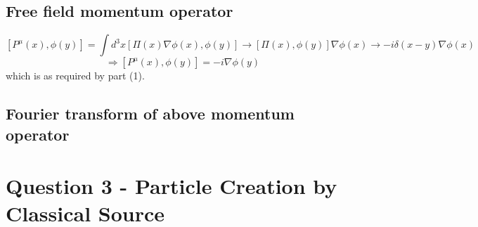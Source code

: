 \documentclass[11pt]{article}
\begin{document}
	\subsection{Free field momentum operator}
	
	\[
		[P^\mu(x),\phi(y)] = \int d^3x [\Pi(x)\nabla\phi(x), \phi(y)] \rightarrow [\Pi(x),\phi(y)]\nabla\phi(x) \rightarrow -i\delta(x-y)\nabla\phi(x)
	\]
	\[
		\Rightarrow \boxed{[P^\mu(x),\phi(y)] = -i \nabla \phi(y)}
	\]
	which is as required by part (1).
	
	\subsection{Fourier transform of above momentum operator}
	
	
	
	\section*{\color{teal}Question 3 - Particle Creation by Classical Source}

	
\end{document}
